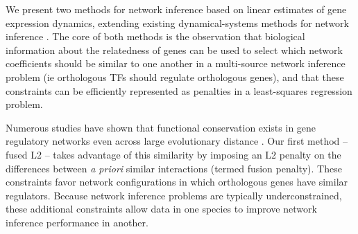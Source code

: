 \documentclass[11pt]{article}
\begin{document}
We present two methods for network inference based on linear estimates of gene expression dynamics, extending existing dynamical-systems methods for network inference \cite{bonneau_predictive_2007, arrieta-ortiz_experimentally_2015, yeung_reverse_2002}. The core of both methods is the observation that biological information about the relatedness of genes can be used to select which network coefficients should be similar to one another in a multi-source network inference problem (ie orthologous TFs should regulate orthologous genes), and that these constraints can be efficiently represented as penalties in a least-squares regression problem.



Numerous studies have shown that functional conservation exists in gene regulatory networks even across large evolutionary distance \cite{satou2006gene, hinman2009evolution,tanay2005conservation,erwin2009evolution}. Our first method -- fused L2 -- takes advantage of this similarity by imposing an L2 penalty on the differences between \textit{a priori} similar interactions (termed fusion penalty). These constraints favor  network configurations in which orthologous genes have similar regulators. Because network inference problems are typically underconstrained, these additional constraints allow data in one species to improve network inference performance in another.
\end{document}
